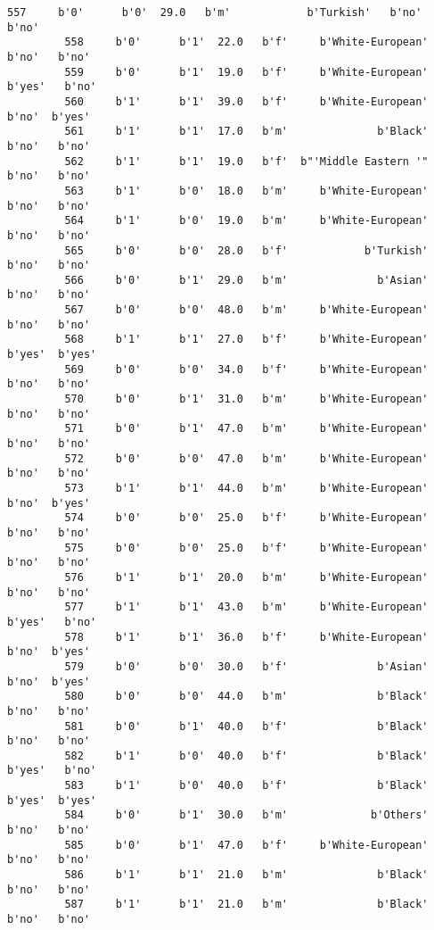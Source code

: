 \documentclass[11pt]{article}
\begin{document}
\begin{Verbatim}[commandchars=\\\{\}]
         557     b'0'      b'0'  29.0   b'm'            b'Turkish'   b'no'   b'no'   
         558     b'0'      b'1'  22.0   b'f'     b'White-European'   b'no'   b'no'   
         559     b'0'      b'1'  19.0   b'f'     b'White-European'  b'yes'   b'no'   
         560     b'1'      b'1'  39.0   b'f'     b'White-European'   b'no'  b'yes'   
         561     b'1'      b'1'  17.0   b'm'              b'Black'   b'no'   b'no'   
         562     b'1'      b'1'  19.0   b'f'  b"'Middle Eastern '"   b'no'   b'no'   
         563     b'1'      b'0'  18.0   b'm'     b'White-European'   b'no'   b'no'   
         564     b'1'      b'0'  19.0   b'm'     b'White-European'   b'no'   b'no'   
         565     b'0'      b'0'  28.0   b'f'            b'Turkish'   b'no'   b'no'   
         566     b'0'      b'1'  29.0   b'm'              b'Asian'   b'no'   b'no'   
         567     b'0'      b'0'  48.0   b'm'     b'White-European'   b'no'   b'no'   
         568     b'1'      b'1'  27.0   b'f'     b'White-European'  b'yes'  b'yes'   
         569     b'0'      b'0'  34.0   b'f'     b'White-European'   b'no'   b'no'   
         570     b'0'      b'1'  31.0   b'm'     b'White-European'   b'no'   b'no'   
         571     b'0'      b'1'  47.0   b'm'     b'White-European'   b'no'   b'no'   
         572     b'0'      b'0'  47.0   b'm'     b'White-European'   b'no'   b'no'   
         573     b'1'      b'1'  44.0   b'm'     b'White-European'   b'no'  b'yes'   
         574     b'0'      b'0'  25.0   b'f'     b'White-European'   b'no'   b'no'   
         575     b'0'      b'0'  25.0   b'f'     b'White-European'   b'no'   b'no'   
         576     b'1'      b'1'  20.0   b'm'     b'White-European'   b'no'   b'no'   
         577     b'1'      b'1'  43.0   b'm'     b'White-European'  b'yes'   b'no'   
         578     b'1'      b'1'  36.0   b'f'     b'White-European'   b'no'  b'yes'   
         579     b'0'      b'0'  30.0   b'f'              b'Asian'   b'no'  b'yes'   
         580     b'0'      b'0'  44.0   b'm'              b'Black'   b'no'   b'no'   
         581     b'0'      b'1'  40.0   b'f'              b'Black'   b'no'   b'no'   
         582     b'1'      b'0'  40.0   b'f'              b'Black'  b'yes'   b'no'   
         583     b'1'      b'0'  40.0   b'f'              b'Black'  b'yes'  b'yes'   
         584     b'0'      b'1'  30.0   b'm'             b'Others'   b'no'   b'no'   
         585     b'0'      b'1'  47.0   b'f'     b'White-European'   b'no'   b'no'   
         586     b'1'      b'1'  21.0   b'm'              b'Black'   b'no'   b'no'   
         587     b'1'      b'1'  21.0   b'm'              b'Black'   b'no'   b'no'   

\end{Verbatim}
\end{document}
